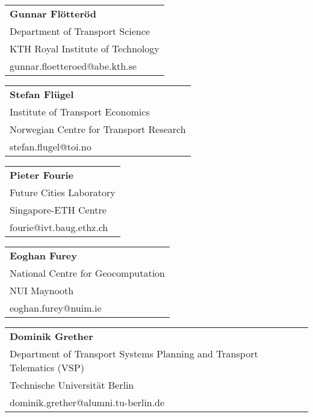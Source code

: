 \begin{tabular}[width=0.48\textwidth]{@{}l}
\textbf{Gunnar Flötteröd} \\
Department of Transport Science \\
KTH Royal Institute of Technology \\
gunnar.floetteroed@abe.kth.se \\
\end{tabular}

\begin{tabular}[width=0.48\textwidth]{@{}l}
\textbf{Stefan Flügel} \\
Institute of Transport Economics \\
Norwegian Centre for Transport Research \\
stefan.flugel@toi.no \\
\end{tabular}

\begin{tabular}[width=0.48\textwidth]{@{}l}
\textbf{Pieter Fourie} \\
Future Cities Laboratory \\
Singapore-ETH Centre\\
fourie@ivt.baug.ethz.ch \\
\end{tabular}

\begin{tabular}[width=0.48\textwidth]{@{}l}
\textbf{Eoghan Furey} \\
National Centre for Geocomputation \\
NUI Maynooth \\
eoghan.furey@nuim.ie \\
\end{tabular}

\begin{tabular}[width=0.48\textwidth]{@{}l}
\textbf{Dominik Grether} \\
Department of Transport Systems Planning and Transport Telematics (VSP) \\
Technische Universität Berlin \\
dominik.grether@alumni.tu-berlin.de\\
\end{tabular}


